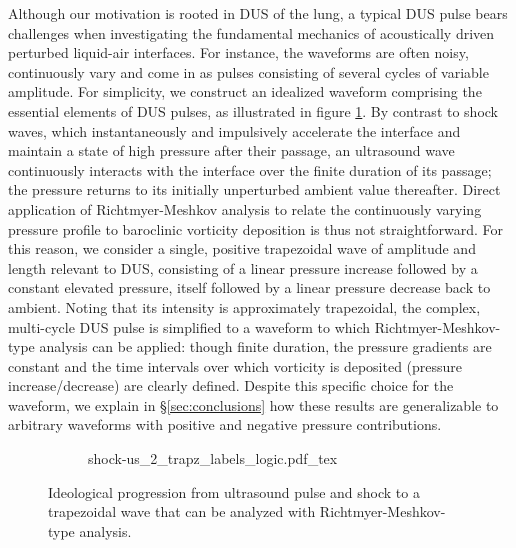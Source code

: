 Although our motivation is rooted in \ac{DUS} of the lung, a typical
\ac{DUS} pulse bears challenges when investigating the fundamental
mechanics of acoustically driven perturbed liquid-air interfaces. For
instance, the waveforms are often noisy, continuously vary and come in
as pulses consisting of several cycles of variable amplitude.  For
simplicity, we construct an idealized waveform comprising the
essential elements of \ac{DUS} pulses, as illustrated in figure
\ref{fig:p0}.  By contrast to shock waves, which instantaneously and
impulsively accelerate the interface and maintain a state of high
pressure after their passage, an ultrasound wave continuously
interacts with the interface over the finite duration of its passage;
the pressure returns to its initially unperturbed ambient value
thereafter. Direct application of Richtmyer-Meshkov analysis to relate
the continuously varying pressure profile to baroclinic vorticity
deposition is thus not straightforward. For this reason, we consider a
single, positive trapezoidal wave of amplitude and length relevant to
\ac{DUS}, consisting of a linear pressure increase followed by a
constant elevated pressure, itself followed by a linear pressure
decrease back to ambient. Noting that its intensity is approximately
trapezoidal, the complex, multi-cycle \ac{DUS} pulse is simplified to
a waveform to which Richtmyer-Meshkov-type analysis can be applied:
though finite duration, the pressure gradients are constant and the
time intervals over which vorticity is deposited (pressure
increase/decrease) are clearly defined. Despite this specific choice
for the waveform, we explain in \S \ref{sec:conclusions} how these results
are generalizable to arbitrary waveforms with positive and negative
pressure contributions.

\begin{figure}%
  \centering%
  \begin{subfigure}[b]{\textwidth}
    \centering
    \def\svgwidth{\textwidth}%
    {shock-us_2_trapz_labels_logic.pdf_tex}%
  \end{subfigure}
  \caption[Trapezoidal wave]{Ideological progression from ultrasound
    pulse and shock to a trapezoidal wave that can be analyzed with
    Richtmyer-Meshkov-type analysis.}%
  \label{fig:p0}
\end{figure}

